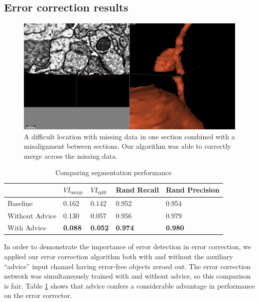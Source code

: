 \documentclass{article}
\begin{document}
\subsection{Error correction results}
\begin{figure}
\begin{center}
	\includegraphics[width=0.65\linewidth]{difficult.jpg}
	\caption{A difficult location with missing data in one section combined with a misalignment between sections. Our algorithm was able to correctly merge across the missing data.}
	\label{fig:difficult}
\end{center}
\end{figure}
\begin{table}[h]
  \caption{Comparing segmentation performance}
  \label{table:vi_scores}
  \centering
  \begin{tabular}{lllll}
    \toprule
	& $VI_\text{merge}$ & $VI_\text{split}$ & Rand Recall & Rand Precision\\
    \midrule
    Baseline & 0.162 & 0.142 & 0.952 & 0.954\\
    Without Advice & 0.130 & 0.057 & 0.956 & 0.979\\
	With Advice & \textbf{0.088} & \textbf{0.052} & \textbf{0.974} & \textbf{0.980}\\
    \bottomrule
  \end{tabular}
\end{table}
In order to demonstrate the importance of error detection in error correction, we applied our error correction algorithm both with and without the auxiliary ``advice'' input channel having error-free objects zeroed out. The error correction network was simultaneously trained with and without advice, so this comparison is fair. Table \ref{table:vi_scores} shows that advice confers a considerable advantage in performance on the error corrector.
\end{document}
